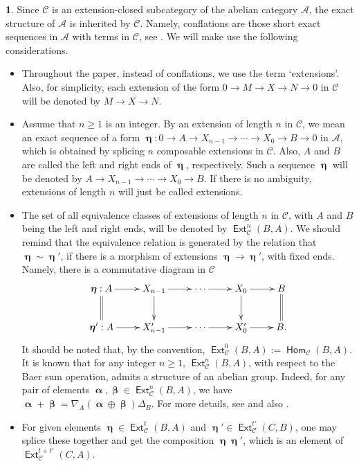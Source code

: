 \documentclass[11pt,a4paper]{amsart}
\newcommand{\rt}{\rightarrow}
\newcommand{\lrt}{\longrightarrow}
\newcommand{\C}{\mathscr{C} }
\def\Ext{\operatorname{{\mathsf{Ext}}}}
\def\hom{\operatorname{{\mathsf{Hom}}}}
\def\hom{\operatorname{\mathsf{Hom}}}
\def\A{\mathcal A}
\def\al{\operatorname{\boldsymbol{\alpha}}}
\def\be{\operatorname{\boldsymbol{\beta}}}
\def\et{\operatorname{\boldsymbol{\eta}}}
\theoremstyle{definition}
\newtheorem{s}[theorem]{}
\theoremstyle{plain}
\theoremstyle{definition}
\numberwithin{equation}{section}
\begin{document}
\begin{s}\label{gener}Since $\C$ is an extension-closed subcategory of the abelian category $\A$, the exact structure of $\A$ is inherited by $\C$. Namely, conflations are those short exact sequences in $\A$ with terms in $\C$,  see \cite[Lemma 10.20]{buh}.  We will make use  the following considerations.
\begin{itemize}
\item[(a)] Throughout the paper, instead of conflations, we use the term `extensions'. Also, for simplicity, each extension of the form $0\rt M\rt X\rt N\rt 0$ in $\C$ will be denoted by $M\rt X\rt N$.
\item[(b)] Assume that $n\geq 1$ is an integer. By an extension of length $n$ in $\C$, we mean an exact sequence of a form $\et: 0\rt A\rt X_{n-1}\rt\cdots\rt X_0\rt B\rt 0$ in $\A$, which is obtained by splicing $n$ composable extensions in $\C$. Also,  $A$ and $B$ are called the left and right ends of $\et$, respectively. Such a sequence $\et$ will be denoted by $ A\rt X_{n-1}\rt\cdots\rt X_0\rt B$. If there is no ambiguity, extensions of length $n$ will just be called extensions.
\item[(c)] The set of all equivalence classes of extensions of length $n$ in $\C$, with  $A$ and $B$ being the left and right ends, will be denoted by $\Ext^n_{\C}(B, A)$. We should remind that the equivalence relation is generated by the relation that $\et\sim\et'$, if there is a morphism of extensions $\et\lrt\et'$, with fixed ends. Namely, there is a commutative diagram in $\C$
{\footnotesize\[\xymatrix{\et: A\ar@{=}[d]\ar[r] & X_{n-1}\ar[d]\ar[r] & \cdots\ar[r] & X_0\ar[r]\ar[d] & B\ar@{=}[d]\\ \et': A\ar[r] & X'_{n-1}\ar[r] & \cdots\ar[r] & X'_0\ar[r] & B.}\]}It should be noted that, by the convention, $\Ext^0_{\C}(B, A):=\hom_{\C}(B, A)$. It is known that for any integer $n\geq 1$, $\Ext^n_{\C}(B, A)$, with respect to the Baer sum operation, admits a structure of an abelian group. Indeed, for any pair of elements $\al, \be\in\Ext^n_{\C}(B, A)$, we have $\al+\be=\nabla_A(\al\oplus\be)\Delta_B$. For more details, see \cite[Chapter VII]{mit} and also \cite[Section 9]{hs}. \item[(d)] For given  elements $\et\in\Ext^t_{\C}(B, A)$ and $\et'\in\Ext^{t'}_{\C}(C, B)$, one may splice these together and get  the composition $\et\et'$, which is  an element of $\Ext^{t+t'}_{\C}(C, A)$.
\end{itemize}
\end{s}
\end{document}
